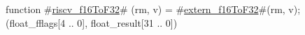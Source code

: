 function #\hyperref[sailRISCVzriscvzyf16ToF32]{riscv\_f16ToF32}# (rm, v) = {
  #\hyperref[sailRISCVzexternzyf16ToF32]{extern\_f16ToF32}#(rm, v);
  (float_fflags[4 .. 0], float_result[31 .. 0])
}
